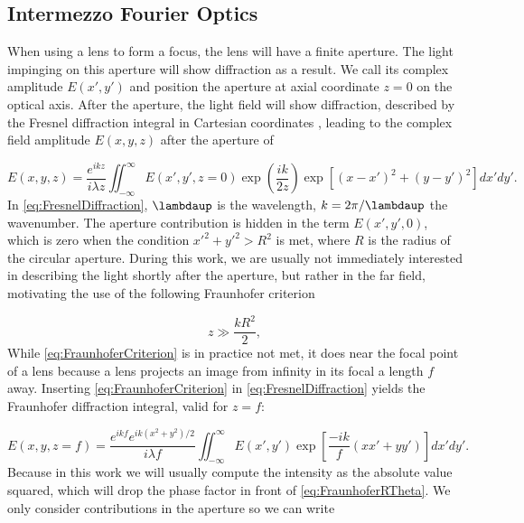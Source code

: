 \begin{mdframed}
    \subsection*{Intermezzo Fourier Optics}
    
    When using a lens to form a focus, the lens will have a finite aperture.
    The light impinging on this aperture will show diffraction as a result.
    We call its complex amplitude $E(x',y')$ and position the aperture at axial coordinate $z = 0$ on the optical axis.
    After the aperture, the light field will show diffraction, described by the Fresnel diffraction integral in Cartesian coordinates \cite{Goodman2005}, leading to the complex field amplitude $E(x,y,z)$ after the aperture of 

    \begin{equation}\label{eq:FresnelDiffraction}
        E(x,y,z) = 
        \frac{e^{ikz}}{i \lambda z} \iint_{-\infty}^{\infty} E(x',y',z=0) \exp{\left(\frac{ik}{2z}\right)} \exp{\left[(x-x')^2+(y-y')^2\right]} dx'dy'.
    \end{equation}
    In \cref{eq:FresnelDiffraction}, $\lambdaup$ is the wavelength, $k=2\pi/\lambdaup$ the wavenumber. The aperture contribution is hidden in the term $E(x',y',0)$, which is zero when the condition $x'^2+y'^2>R^2$ is met, where $R$ is the radius of the circular aperture.
    During this work, we are usually not immediately interested in describing the light shortly after the aperture, but rather in the far field, motivating the use of the following Fraunhofer criterion
    
    \begin{equation}\label{eq:FraunhoferCriterion}
        z \gg \frac{k R^2}{2},
    \end{equation}
    While \cref{eq:FraunhoferCriterion} is in practice not met, it does near the focal point of a lens because a lens projects an image from infinity in its focal a length $f$ away. 
    Inserting \cref{eq:FraunhoferCriterion} in \cref{eq:FresnelDiffraction} yields the Fraunhofer diffraction integral, valid for $z=f$:
    
    \begin{equation}\label{eq:FraunhoferDiffraction}
        E(x, y, z=f)=\frac{e^{i k f} e^{i k\left(x^{2}+y^{2}\right)/2}}{i \lambda f} \iint_{-\infty}^{\infty} E(x', y') \exp \left[\frac{-ik}{f}(x x'+y y')\right] dx' dy'.
    \end{equation}
    Because in this work we will usually compute the intensity as the absolute value squared, which will drop the phase factor in front of \cref{eq:FraunhoferRTheta}. 
    We only consider contributions in the aperture so we can write
    

\end{mdframed}
